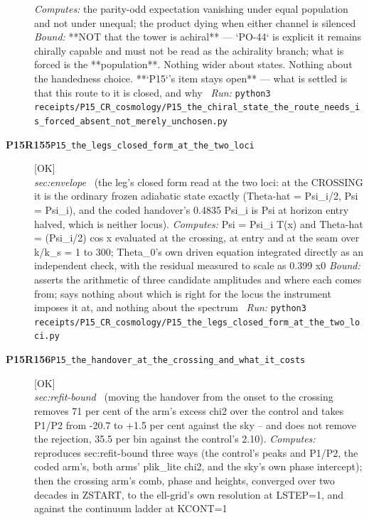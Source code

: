 \begin{description}
\emph{Computes:} the parity-odd expectation vanishing under equal population and not under unequal; the product dying when either channel is silenced
 \emph{Bound:}  **NOT that the tower is achiral** --- `PO-44` is explicit it remains chirally capable and must not be read as the achirality branch; what is forced is the **population**. Nothing wider about states. Nothing about the handedness choice. **`P15`'s item stays open** --- what is settled is that this route to it is closed, and why
\ \emph{Run:} \texttt{python3 receipts/P15\_CR\_cosmology/P15\_the\_chiral\_state\_the\_route\_needs\_is\_forced\_absent\_not\_merely\_unchosen.py}
\item[\rcptlabel{P15_the_legs_closed_form_at_the_two_loci}{P15R155}\textbf{P15R155}\quad\texttt{P15\_the\_legs\_closed\_form\_at\_the\_two\_loci}]\hfill\textsf{[OK]}\\
\textit{sec:envelope} \ (the leg's closed form read at the two loci: at the CROSSING it is the ordinary frozen adiabatic state exactly (Theta-hat = Psi\_i/2, Psi = Psi\_i), and the coded handover's 0.4835 Psi\_i is Psi at horizon entry halved, which is neither locus). 
\emph{Computes:} Psi = Psi\_i T(x) and Theta-hat = (Psi\_i/2) cos x evaluated at the crossing, at entry and at the seam over k/k\_s = 1 to 300; Theta\_0's own driven equation integrated directly as an independent check, with the residual measured to scale as 0.399 x0
 \emph{Bound:} asserts the arithmetic of three candidate amplitudes and where each comes from; says nothing about which is right for the locus the instrument imposes it at, and nothing about the spectrum
\ \emph{Run:} \texttt{python3 receipts/P15\_CR\_cosmology/P15\_the\_legs\_closed\_form\_at\_the\_two\_loci.py}
\item[\rcptlabel{P15_the_handover_at_the_crossing_and_what_it_costs}{P15R156}\textbf{P15R156}\quad\texttt{P15\_the\_handover\_at\_the\_crossing\_and\_what\_it\_costs}]\hfill\textsf{[OK]}\\
\textit{sec:refit-bound} \ (moving the handover from the onset to the crossing removes 71 per cent of the arm's excess chi2 over the control and takes P1/P2 from -20.7 to +1.5 per cent against the sky -- and does not remove the rejection, 35.5 per bin against the control's 2.10). 
\emph{Computes:} reproduces sec:refit-bound three ways (the control's peaks and P1/P2, the coded arm's, both arms' plik\_lite chi2, and the sky's own phase intercept); then the crossing arm's comb, phase and heights, converged over two decades in ZSTART, to the ell-grid's own resolution at LSTEP=1, and against the continuum ladder at KCONT=1

\end{description}
